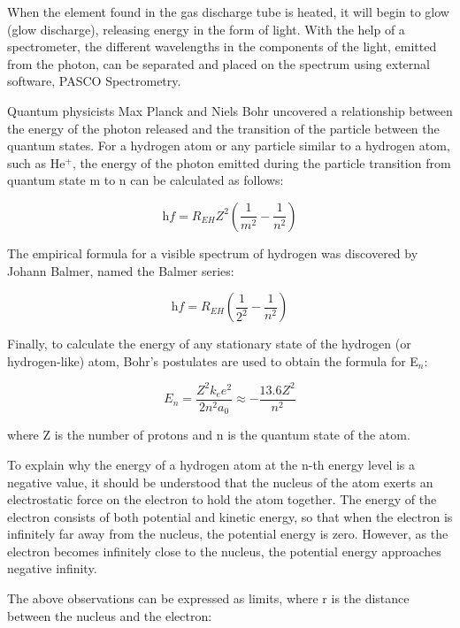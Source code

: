 \documentclass[10pt, letterpaper, twoside]{article}
\begin{document}
When the element found in the gas discharge tube is heated, it will begin to glow (glow discharge), releasing energy in the form of light. With the help of a spectrometer, the different wavelengths in the components of the light, emitted from the photon, can be separated and placed on the spectrum using external software, PASCO Spectrometry. 

Quantum physicists Max Planck and Niels Bohr uncovered a relationship between the energy of the photon released and the transition of the particle between the quantum states. For a hydrogen atom or any particle similar to a hydrogen atom, such as He$^+$, the energy of the photon emitted during the particle transition from quantum state m to n can be calculated as follows:\vspace{-1em}

\begin{equation}
\textit{hf} = R_{EH}Z^2(\frac{1}{m^2}-\frac{1}{n^2}) 
\end{equation}

The empirical formula for a visible spectrum of hydrogen was discovered by Johann Balmer, named the Balmer series:

\begin{equation}
    \textit{hf} = R_{EH}(\frac{1}{2^2}-\frac{1}{n^2}) 
\end{equation}

Finally, to calculate the energy of any stationary state of the hydrogen (or hydrogen-like) atom, Bohr's postulates are used to obtain the formula for E$_n$:

\begin{equation}
    E_n = \frac{Z^2k_ee^2}{2n^2a_0} \approx -\frac{13.6Z^2}{n^2}
\end{equation}

where Z is the number of protons and n is the quantum state of the atom.

To explain why the energy of a hydrogen atom at the n-th energy level is a negative value, it should be understood that the nucleus of the atom exerts an electrostatic force on the electron to hold the atom together. The energy of the electron consists of both potential and kinetic energy, so that when the electron is infinitely far away from the nucleus, the potential energy is zero. However, as the electron becomes infinitely close to the nucleus, the potential energy approaches negative infinity.

The above observations can be expressed as limits, where r is the distance between the nucleus and the electron: \vspace{-2.5em}
\end{document}
